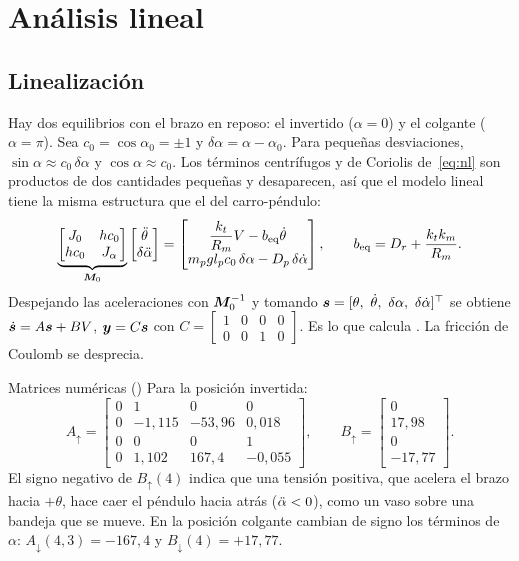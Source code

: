 \chapter{Análisis lineal}
\label{cap:analisis}

\section{Linealización}

Hay dos equilibrios con el brazo en reposo: el invertido ($\alpha=0$) y el colgante ($\alpha=\pi$). Sea $c_0=\cos\alpha_0=\pm1$ y $\delta\alpha=\alpha-\alpha_0$. Para pequeñas desviaciones, $\sin\alpha\approx c_0\,\delta\alpha$ y $\cos\alpha\approx c_0$. Los términos centrífugos y de Coriolis de~\eqref{eq:nl} son productos de dos cantidades pequeñas y desaparecen, así que el modelo lineal tiene la misma estructura que el del carro-péndulo:
\begin{equation}
  \underbrace{\begin{bmatrix} J_0 & hc_0\\ hc_0 & J_\alpha\end{bmatrix}}_{\bm{M}_0}
  \begin{bmatrix}\ddot{\theta}\\ \delta\ddot{\alpha}\end{bmatrix}
  =
  \begin{bmatrix} \dfrac{k_t}{R_m}V - b_{\text{eq}}\dot{\theta}\\[1ex] m_pgl_pc_0\,\delta\alpha - D_p\,\delta\dot{\alpha}\end{bmatrix},
  \qquad b_{\text{eq}} = D_r + \frac{k_tk_m}{R_m}.
  \label{eq:lin}
\end{equation}
Despejando las aceleraciones con $\bm{M}_0^{-1}$ y tomando $\vect s=[\theta,\ \thd,\ \delta\alpha,\ \delta\ald]^\top$ se obtiene $\dot{\bm{s}}=A\bm{s}+BV$, $\bm{y}=C\bm{s}$ con $C=\left[\begin{smallmatrix}1&0&0&0\\0&0&1&0\end{smallmatrix}\right]$. Es lo que calcula . La fricción de Coulomb se desprecia.

\begin{ejemplo}{Matrices numéricas ()}
Para la posición invertida:
\[
A_\uparrow=\begin{bmatrix}0&1&0&0\\ 0&-1{,}115&-53{,}96&0{,}018\\ 0&0&0&1\\ 0&1{,}102&167{,}4&-0{,}055\end{bmatrix},\qquad
B_\uparrow=\begin{bmatrix}0\\ 17{,}98\\ 0\\ -17{,}77\end{bmatrix}.
\]
El signo negativo de $B_\uparrow(4)$ indica que una tensión positiva, que acelera el brazo hacia $+\theta$, hace caer el péndulo hacia atrás ($\ddot{\alpha}<0$), como un vaso sobre una bandeja que se mueve. En la posición colgante cambian de signo los términos de $\alpha$: $A_\downarrow(4,3)=-167{,}4$ y $B_\downarrow(4)=+17{,}77$.
\end{ejemplo}


